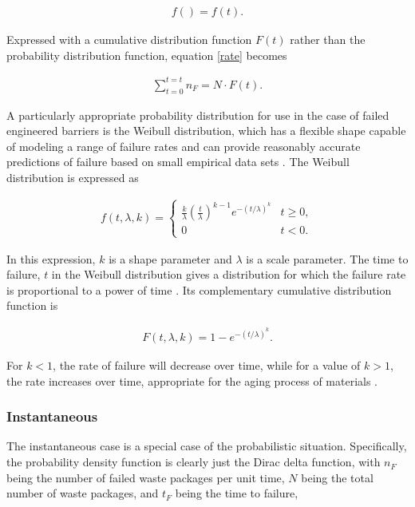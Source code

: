 \begin{align}
  f()=f(t).
  \label{probabilistic}
\end{align}

Expressed with a cumulative distribution function $F(t)$ rather than the
probability distribution function, equation \eqref{rate} becomes 


\begin{align}
  \sum_{t=0}^{t=t}n_F=N\cdot F(t).
  \label{cdf}
\end{align}


A particularly appropriate probability distribution for use in the case of failed 
engineered barriers is the Weibull distribution, which has a flexible shape 
capable of modeling a range of failure rates and can provide reasonably 
accurate predictions of failure based on small empirical data sets 
\cite{murthy_weibull_2004}. The Weibull distribution is expressed as

\begin{align}
  f(t,\lambda,k) =  \begin{cases}
    \frac{k}{\lambda}\left(\frac{t}{\lambda}\right)^{k-1}e^{-(t/\lambda)^{k}} & 
    t\geq0 ,\\
    0 & t<0 .\end{cases}
  \label{weibullpdf}
\end{align}


In this expression, $k$ is a shape parameter and $\lambda$ is a scale
parameter. The time to failure, $t$ in the Weibull distribution gives a 
distribution for which the failure rate is proportional to a power of time 
\cite{papoulis_probability_2002}. Its complementary cumulative distribution
function is 

\begin{align}
  F(t,\lambda,k) = 1-e^{-(t/\lambda)^k}.
  \label{weibullcdf}
\end{align}

For $k<1$, the rate of failure will decrease over time, while for a value of 
$k>1$, the rate increases over time, appropriate for the aging process of 
materials  \cite{papoulis_probability_2002}.


\subsubsection{Instantaneous}

The instantaneous case is a special case of the probabilistic situation.
Specifically, the probability density function is clearly just the Dirac 
delta function, with $n_F$ being the number of failed waste packages per 
unit time, $N$ being the total number of waste packages, and $t_F$ being 
the time to failure,

